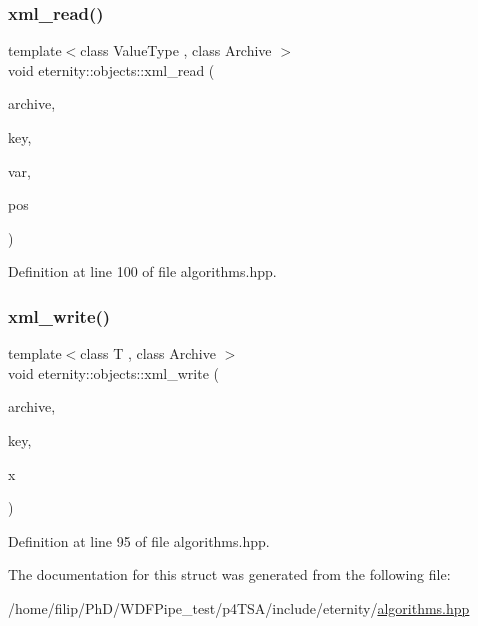 \subsubsection{\texorpdfstring{xml\+\_\+read()}{xml\_read()}}
{\footnotesize\ttfamily template$<$class Value\+Type , class Archive $>$ \\
void eternity\+::objects\+::xml\+\_\+read (\begin{DoxyParamCaption}\item[{Archive \&}]{archive,  }\item[{std\+::string}]{key,  }\item[{Value\+Type $\ast$}]{var,  }\item[{size\+\_\+t}]{pos }\end{DoxyParamCaption})}



Definition at line 100 of file algorithms.\+hpp.

\mbox{\label{structeternity_1_1objects_a1c4f6adbfec429e299ed9b87d3e882dc}} 
\subsubsection{\texorpdfstring{xml\+\_\+write()}{xml\_write()}}
{\footnotesize\ttfamily template$<$class T , class Archive $>$ \\
void eternity\+::objects\+::xml\+\_\+write (\begin{DoxyParamCaption}\item[{Archive \&}]{archive,  }\item[{std\+::string}]{key,  }\item[{T \&}]{x }\end{DoxyParamCaption})}



Definition at line 95 of file algorithms.\+hpp.



The documentation for this struct was generated from the following file\+:\begin{DoxyCompactItemize}
\item 
/home/filip/\+Ph\+D/\+W\+D\+F\+Pipe\+\_\+test/p4\+T\+S\+A/include/eternity/\hyperlink{algorithms_8hpp}{algorithms.\+hpp}\end{DoxyCompactItemize}
